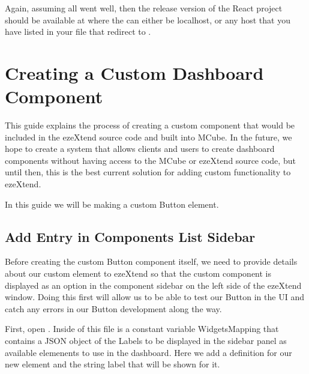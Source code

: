 \documentclass[letterpaper,10pt,english]{sphinxmanual}
\begin{document}
\sphinxAtStartPar
Again, assuming all went well, then the release version of the React project should be available at  where the  can either be localhost, or any host that you have listed in your  file that redirect to .

\sphinxstepscope


\chapter{Creating a Custom Dashboard Component}
\label{\detokenize{custom_component/index:creating-a-custom-dashboard-component}}\label{\detokenize{custom_component/index::doc}}
\sphinxAtStartPar
This guide explains the process of creating a custom component that would be included in the ezeXtend source code and built into MCube. In the future, we hope to create a system that allows clients and users to create dashboard components without having access to the MCube or ezeXtend source code, but until then, this is the best current solution for adding custom functionality to ezeXtend.

\sphinxAtStartPar
In this guide we will be making a custom Button element.

\sphinxstepscope


\section{Add Entry in Components List Sidebar}
\label{\detokenize{custom_component/add_entry:add-entry-in-components-list-sidebar}}\label{\detokenize{custom_component/add_entry::doc}}
\sphinxAtStartPar
Before creating the custom Button component itself, we need to provide details about our custom element to ezeXtend so that the custom component is displayed as an option in the component sidebar on the left side of the ezeXtend window. Doing this first will allow us to be able to test our Button in the UI and catch any errors in our Button development along the way.

\sphinxAtStartPar
First, open . Inside of this file is a constant variable WidgetsMapping that contains a JSON object of the Labels to be displayed in the sidebar panel as available elemenents to use in the dashboard. Here we add a definition for our new element  and the string label that will be shown for it.
\end{document}
